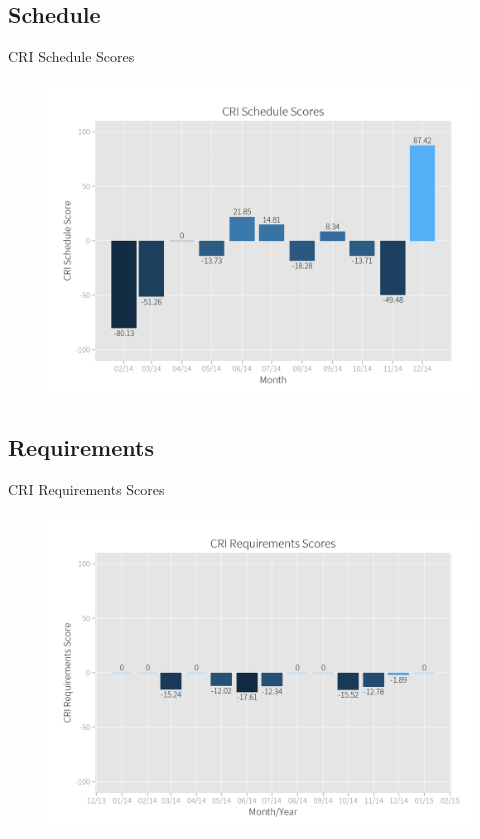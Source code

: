     \subsection{Schedule}
        \begin{frame}{CRI Schedule Scores}
            \begin{figure}
                \centering
                \includegraphics[scale=.23]{images/schedule_scores.png}
            \end{figure}
        \end{frame}
    \subsection{Requirements}
        \begin{frame}{CRI Requirements Scores}
            \begin{figure}
                \centering
                \includegraphics[scale=.23]{images/requirements_scores.png}
            \end{figure}
        \end{frame}
